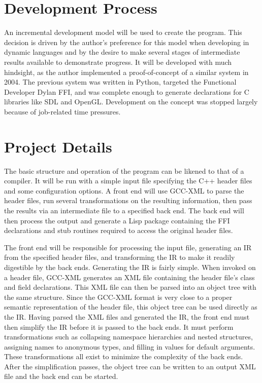 \documentclass[12pt]{article}
\begin{document}
\section{Development Process}

An incremental development model will be used to create the program.
This decision is driven by the author's preference for this model when
developing in dynamic languages and by the desire to make several
stages of intermediate results available to demonstrate progress. It
will be developed with much hindsight, as the author implemented a
proof-of-concept of a similar system in 2004. The previous system was
written in Python, targeted the Functional Developer Dylan FFI, and
was complete enough to generate declarations for C libraries like SDL
and OpenGL. Development on the concept was stopped largely because of
job-related time pressures.

\section{Project Details}

The basic structure and operation of the program can be likened to
that of a compiler. It will be run with a simple input file specifying
the C++ header files and some configuration options. A front end will
use GCC-XML to parse the header files, run several transformations on
the resulting information, then pass the results via an intermediate
file to a specified back end. The back end will then process the
output and generate a Lisp package containing the FFI declarations and
stub routines required to access the original header files.

The front end will be responsible for processing the input file,
generating an IR from the specified header files, and transforming the
IR to make it readily digestible by the back ends. Generating the IR
is fairly simple. When invoked on a header file, GCC-XML generates an
XML file containing the header file's class and field declarations.
This XML file can then be parsed into an object tree with the same
structure. Since the GCC-XML format is very close to a proper semantic
representation of the header file, this object tree can be used
directly as the IR. Having parsed the XML files and generated the IR,
the front end must then simplify the IR before it is passed to the
back ends. It must perform transformations such as collapsing
namespace hierarchies and nested structures, assigning names to
anonymous types, and filling in values for default arguments. These
transformations all exist to minimize the complexity of the back ends.
After the simplification passes, the object
 tree can be written to an output XML file and the back end can be started.
\end{document}
